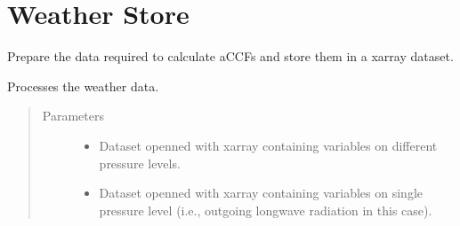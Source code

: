 \documentclass[a4paper,11pt,english]{sphinxmanual}
\begin{document}
\section{Weather Store}
\label{\detokenize{modules:weather-store}}

\begin{fulllineitems}
\label{\detokenize{modules:envlib.weather_store.WeatherStore}}
Prepare the data required to calculate aCCFs and store them in a xarray dataset.

\begin{fulllineitems}
\label{\detokenize{modules:envlib.weather_store.WeatherStore.__init__}}
Processes the weather data.
\begin{quote}\begin{description}
\item[{Parameters}] \leavevmode\begin{itemize}
\item {} 
 \textendash{} Dataset openned with xarray containing variables on different pressure levels.

\item {} 
 \textendash{} Dataset openned with xarray containing variables on single pressure level (i.e., outgoing longwave radiation in this case).

\end{itemize}

\end{description}\end{quote}


\end{fulllineitems}
\end{fulllineitems}
\end{document}
